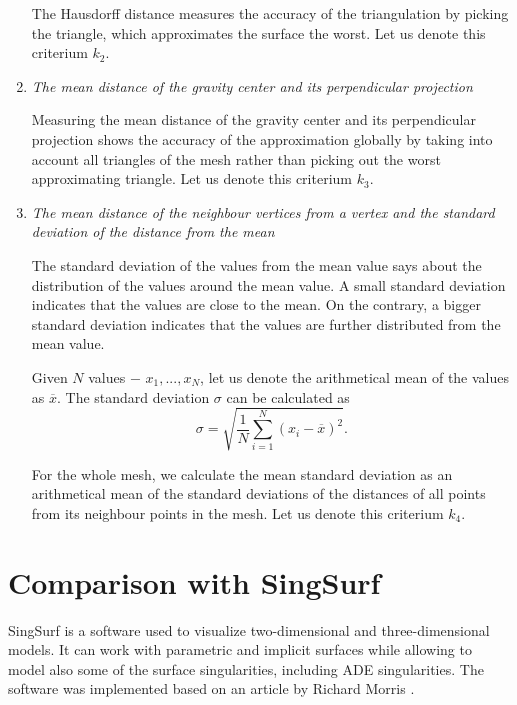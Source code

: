 \begin{enumerate}
    The Hausdorff distance measures the accuracy of the triangulation by picking the 
    triangle, which approximates the surface the worst.
    Let us denote this criterium $k_2$.

    \item \textit{The mean distance of the gravity center and its perpendicular projection}
    
    Measuring the mean distance of the gravity center and its perpendicular projection shows the accuracy of the approximation globally by taking into
    account all triangles of the mesh rather than picking out the worst approximating 
    triangle.
    Let us denote this criterium $k_3$.

    \item \textit{The mean distance of the neighbour vertices from a vertex and the standard deviation of the distance from the mean}

    The standard deviation of the values from the mean value says about the 
    distribution of the values around the mean value. A small standard deviation indicates
    that the values are close to the mean. On the contrary, a bigger standard deviation
    indicates that the values are further distributed from the mean value.

    \begin{definition}
        Given $N$ values $-$ $x_1, ..., x_N$, let us denote the arithmetical mean 
        of the values as $\overline{x}$. The standard deviation $\sigma$ can be calculated
        as
        \begin{equation}
            \sigma = \sqrt{\frac{1}{N} \sum\limits_{i=1}^{N}(x_i - \overline{x})^2}. 
        \end{equation}
    \end{definition}

    For the whole mesh, we calculate the mean standard deviation as an arithmetical
    mean of the 
    standard deviations of the distances of all points from its neighbour points in the mesh.
    Let us denote this criterium $k_4$.
\end{enumerate}

\section{Comparison with SingSurf}
\label{sub4.2}

SingSurf \cite{morris2003client} is a software used to visualize two-dimensional
and three-dimensional models. It can work with parametric and implicit surfaces 
while allowing to model also some of the surface singularities, including
ADE singularities. The software was implemented based on an article by 
Richard Morris \cite{morris2003client}.

